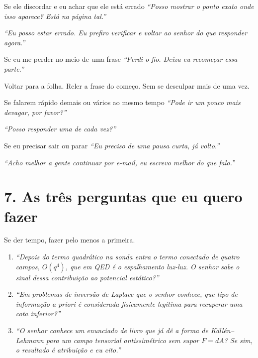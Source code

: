 \documentclass[12pt,a4paper]{article}
\newcommand{\fala}[1]{\textit{\color{ink}``#1''}}
\begin{document}
\begin{say}{Se ele discordar e eu achar que ele está errado}
\fala{Posso mostrar o ponto exato onde isso aparece? Está na página tal.}\par
\fala{Eu posso estar errado. Eu prefiro verificar e voltar ao senhor do que
responder agora.}
\end{say}

\begin{say}{Se eu me perder no meio de uma frase}
\fala{Perdi o fio. Deixa eu recomeçar essa parte.}\par
Voltar para a folha. Reler a frase do começo. Sem se desculpar mais de uma vez.
\end{say}

\begin{say}{Se falarem rápido demais ou vários ao mesmo tempo}
\fala{Pode ir um pouco mais devagar, por favor?}\par
\fala{Posso responder uma de cada vez?}
\end{say}

\begin{say}{Se eu precisar sair ou parar}
\fala{Eu preciso de uma pausa curta, já volto.}\par
\fala{Acho melhor a gente continuar por e-mail, eu escrevo melhor do que falo.}
\end{say}

\section*{7. As três perguntas que eu quero fazer}

Se der tempo, fazer pelo menos a primeira.

\begin{enumerate}[leftmargin=7mm,itemsep=3pt]
\item \fala{Depois do termo quadrático na sonda entra o termo conectado de
quatro campos, $O(q^4)$, que em QED é o espalhamento luz-luz. O senhor sabe o
sinal dessa contribuição ao potencial estático?}
\item \fala{Em problemas de inversão de Laplace que o senhor conhece, que tipo
de informação a priori é considerada fisicamente legítima para recuperar uma
cota inferior?}
\item \fala{O senhor conhece um enunciado de livro que já dê a forma de
Källén--Lehmann para um campo tensorial antissimétrico sem supor $F=dA$?
Se sim, o resultado é atribuição e eu cito.}
\end{enumerate}
\end{document}
